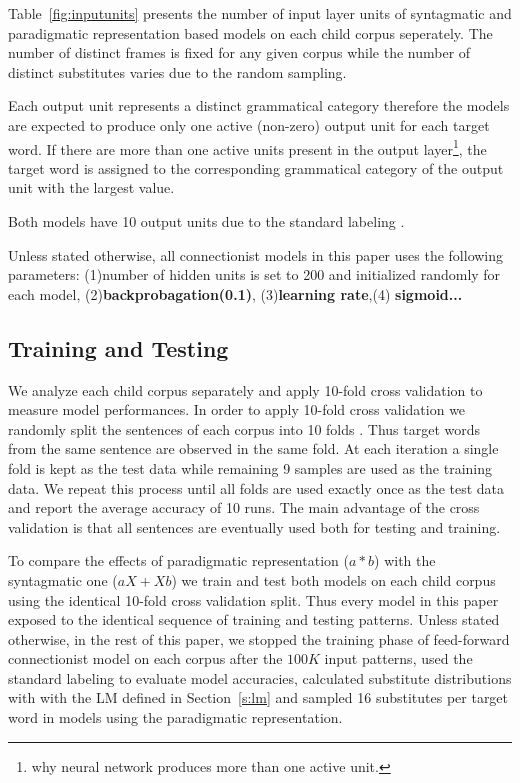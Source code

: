 Table~\ref{fig:inputunits} presents the number of input layer units of
syntagmatic and paradigmatic representation based models on each child
corpus seperately.  The number of distinct frames is fixed for any
given corpus while the number of distinct substitutes varies due to
the random sampling.

Each output unit represents a distinct grammatical category therefore the
models are expected to produce only one active (non-zero) output unit for each
target word.  If there are more than one active units present in the output
layer\footnote{why neural network produces more than one active unit.}, the
target word is assigned to the corresponding grammatical category of the output
unit with the largest value.

Both models have 10 output units due to the standard labeling
\citep*{Mintz200391}.

Unless stated otherwise, all connectionist models in this paper uses the
following parameters: (1)number of hidden units is set to 200 and initialized
randomly for each model, (2){\bf backprobagation(0.1)}, (3){\bf learning
rate},(4) {\bf sigmoid...}

\subsection{Training and Testing}
\label{sec:training}

We analyze each child corpus separately and apply 10-fold cross validation to
measure model performances.  In order to apply 10-fold cross validation we
randomly split the sentences of each corpus into 10 folds .  Thus target words
from the same sentence are observed in the same fold.  At each iteration a
single fold is kept as the test data while remaining 9 samples are used as the
training data.  We repeat this process until all folds are used exactly once as
the test data and report the average accuracy of 10 runs.  The main advantage
of the cross validation is that all sentences are eventually used both for
testing and training.

To compare the effects of paradigmatic representation ($a*b$) with the
syntagmatic one ($aX+Xb$) we train and test both models on each child corpus
using the identical 10-fold cross validation split.  Thus every model in this
paper exposed to the identical sequence of training and testing patterns.
Unless stated otherwise, in the rest of this paper, we stopped the training
phase of feed-forward connectionist model on each corpus after the $100K$ input
patterns, used the standard labeling to evaluate model accuracies, calculated
substitute distributions with with the LM defined in Section~\ref{s:lm} and
sampled 16 substitutes per target word in models using the paradigmatic
representation.

